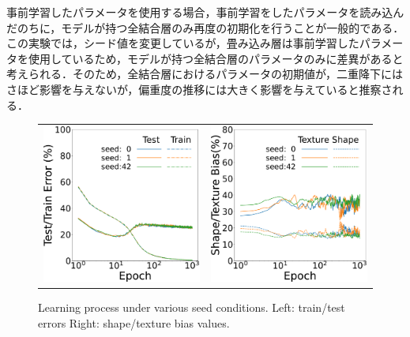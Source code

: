 事前学習したパラメータを使用する場合，事前学習をしたパラメータを読み込んだのちに，モデルが持つ全結合層のみ再度の初期化を行うことが一般的である．この実験では，シード値を変更しているが，畳み込み層は事前学習したパラメータを使用しているため，モデルが持つ全結合層のパラメータのみに差異があると考えられる．そのため，全結合層におけるパラメータの初期値が，二重降下にはさほど影響を与えないが，偏重度の推移には大きく影響を与えていると推察される．

\begin{figure}[htb]
\centering
   \begin{tabular}{cc}
      \includegraphics[keepaspectratio, width=0.45\linewidth]{fig/seed_learning_curv.pdf} &
       \hspace{5pt} 
      \includegraphics[keepaspectratio, width=0.45\linewidth]{fig/seed_sha_tex.pdf}
   \end{tabular}
\caption[Learning process under various seed conditions.]{Learning process under various seed conditions. Left: train/test errors Right: shape/texture bias values.}
\label{fig:comp_seed}
\end{figure}

